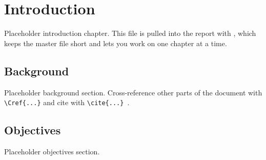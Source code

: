 \chapter{Introduction}
\label{ch:intro}

Placeholder introduction chapter. This file is pulled into the report with
\verb||, which keeps the master file short and lets you
work on one chapter at a time.

\section{Background}
\label{sec:background}
Placeholder background section. Cross-reference other parts of the document
with \verb|\Cref{...}| and cite with \verb|\cite{...}|~\cite{placeholder-report}.

\section{Objectives}
\label{sec:objectives}
Placeholder objectives section.
